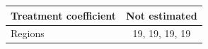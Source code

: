 \begingroup
\centering
\begin{tabular}{lc}
\toprule
Treatment coefficient & Not estimated\\
\midrule
Regions & 19, 19, 19, 19\\
\bottomrule
\end{tabular}
\par\endgroup
